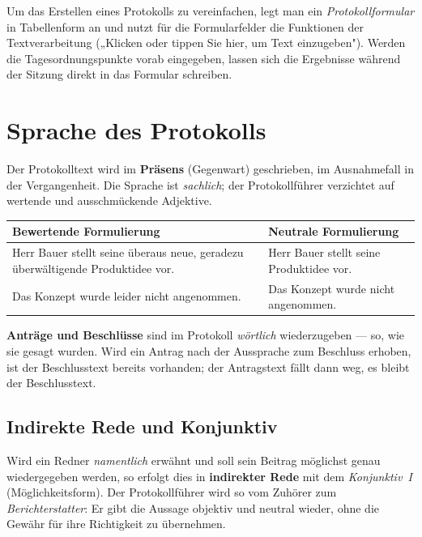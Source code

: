 \documentclass[11pt, a4paper]{article}
\begin{document}
\begin{beispiel}
Um das Erstellen eines Protokolls zu vereinfachen, legt man ein \emph{Protokollformular}
in Tabellenform an und nutzt für die Formularfelder die Funktionen der Textverarbeitung
(„Klicken oder tippen Sie hier, um Text einzugeben"). Werden die Tagesordnungspunkte
vorab eingegeben, lassen sich die Ergebnisse während der Sitzung direkt in das Formular
schreiben.
\end{beispiel}

\section{Sprache des Protokolls}

Der Protokolltext wird im \textbf{Präsens} (Gegenwart) geschrieben, im Ausnahmefall in
der Vergangenheit. Die Sprache ist \emph{sachlich}; der Protokollführer verzichtet auf
wertende und ausschmückende Adjektive.

\begin{center}
\begin{tabular}{p{6.0cm} p{6.0cm}}
\toprule
\textbf{Bewertende Formulierung} & \textbf{Neutrale Formulierung}\\
\midrule
Herr Bauer stellt seine überaus neue, geradezu überwältigende Produktidee vor. & Herr Bauer stellt seine Produktidee vor.\\
Das Konzept wurde leider nicht angenommen. & Das Konzept wurde nicht angenommen.\\
\bottomrule
\end{tabular}
\end{center}

\medskip
\textbf{Anträge und Beschlüsse} sind im Protokoll \emph{wörtlich} wiederzugeben --- so, wie
sie gesagt wurden. Wird ein Antrag nach der Aussprache zum Beschluss erhoben, ist der
Beschlusstext bereits vorhanden; der Antragstext fällt dann weg, es bleibt der
Beschlusstext.

\subsection{Indirekte Rede und Konjunktiv}

Wird ein Redner \emph{namentlich} erwähnt und soll sein Beitrag möglichst genau
wiedergegeben werden, so erfolgt dies in \textbf{indirekter Rede} mit dem \emph{Konjunktiv~I}
(Möglichkeitsform). Der Protokollführer wird so vom Zuhörer zum \emph{Berichterstatter}:
Er gibt die Aussage objektiv und neutral wieder, ohne die Gewähr für ihre Richtigkeit zu
übernehmen.
\end{document}
